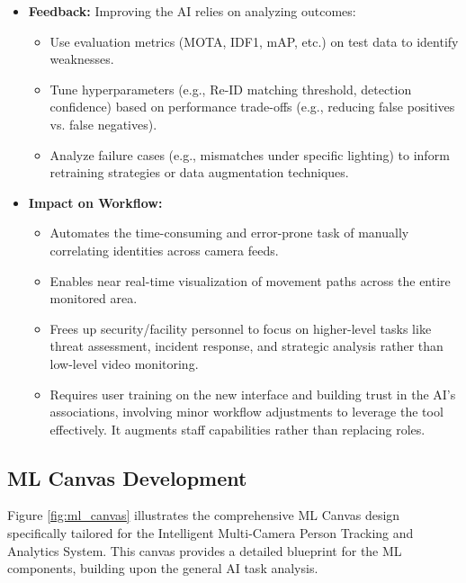 \begin{itemize}
    \item \textbf{Feedback:} Improving the AI relies on analyzing outcomes:
        \begin{itemize}
            \item Use evaluation metrics (MOTA, IDF1, mAP, etc.) on test data to identify weaknesses.
            \item Tune hyperparameters (e.g., Re-ID matching threshold, detection confidence) based on performance trade-offs (e.g., reducing false positives vs. false negatives).
            \item Analyze failure cases (e.g., mismatches under specific lighting) to inform retraining strategies or data augmentation techniques.
        \end{itemize}

    \item \textbf{Impact on Workflow:}
        \begin{itemize}
            \item Automates the time-consuming and error-prone task of manually correlating identities across camera feeds.
            \item Enables near real-time visualization of movement paths across the entire monitored area.
            \item Frees up security/facility personnel to focus on higher-level tasks like threat assessment, incident response, and strategic analysis rather than low-level video monitoring.
            \item Requires user training on the new interface and building trust in the AI's associations, involving minor workflow adjustments to leverage the tool effectively. It augments staff capabilities rather than replacing roles.
        \end{itemize}
\end{itemize}


\subsection{ML Canvas Development}
\label{subsection:ml_canvas_dev}
Figure \ref{fig:ml_canvas} illustrates the comprehensive ML Canvas design specifically tailored for the Intelligent Multi-Camera Person Tracking and Analytics System. This canvas provides a detailed blueprint for the ML components, building upon the general AI task analysis.

